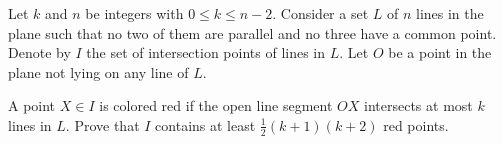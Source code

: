 Let $k$ and $n$ be integers with $0 \leq k \leq n - 2$. Consider a set $L$ of $n$ lines in the plane such that no two of them are parallel and no three have a common point. Denote by $I$ the set of intersection points of lines in $L$. Let $O$ be a point in the plane not lying on any line of $L$.

A point $X \in I$ is colored red if the open line segment $OX$ intersects at most $k$ lines in $L$. Prove that $I$ contains at least $\frac{1}{2}(k + 1)(k + 2)$ red points.
